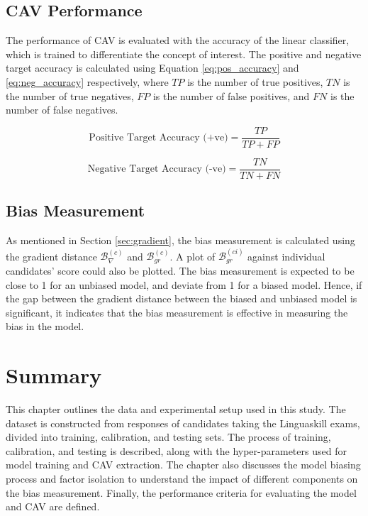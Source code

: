 \subsection{CAV Performance}
The performance of CAV is evaluated with the accuracy of the linear classifier, which is trained to differentiate the concept of interest. The positive and negative target accuracy is calculated using Equation \ref{eq:pos_accuracy} and \ref{eq:neg_accuracy} respectively, where $TP$ is the number of true positives, $TN$ is the number of true negatives, $FP$ is the number of false positives, and $FN$ is the number of false negatives.

\begin{equation} \label{eq:pos_accuracy}
    \text{Positive Target Accuracy (+ve)} = \frac{TP}{TP + FP}
\end{equation}

\begin{equation} \label{eq:neg_accuracy}
    \text{Negative Target Accuracy (-ve)} = \frac{TN}{TN + FN}
\end{equation}

\subsection{Bias Measurement}
As mentioned in Section \ref{sec:gradient}, the bias measurement is calculated using the gradient distance $\mathcal{B}^{(c)}_{\nabla}$ and $\mathcal{B}^{(c)}_{gr}$. A plot of $\mathcal{B}^{(ci)}_{gr}$ against individual candidates' score could also be plotted. The bias measurement is expected to be close to 1 for an unbiased model, and deviate from 1 for a biased model. Hence, if the gap between the gradient distance between the biased and unbiased model is significant, it indicates that the bias measurement is effective in measuring the bias in the model.

\section{Summary}
This chapter outlines the data and experimental setup used in this study. The dataset is constructed from responses of candidates taking the Linguaskill exams, divided into training, calibration, and testing sets. The process of training, calibration, and testing is described, along with the hyper-parameters used for model training and CAV extraction. The chapter also discusses the model biasing process and factor isolation to understand the impact of different components on the bias measurement. Finally, the performance criteria for evaluating the model and CAV are defined.